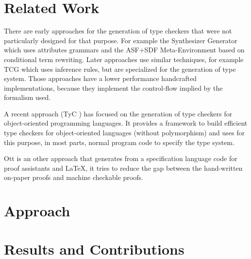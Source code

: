 \documentclass{acm_proc_article-sp}
\begin{document}
\section{Related Work}
There are early approaches for the generation of type checkers that
were not particularly designed for that purpose. For example the
Synthesizer Generator \cite{Reps:1984:SG:800020.808247} which uses
attributes grammars and the ASF+SDF Meta-Environment
\cite{vandenBrand:2001:AMC:647477.727788} based on conditional term
rewriting. Later approaches use similar techniques, for example TCG
\cite{phd/de/Gast2005} which uses inference rules, but are specialized
for the generation of type system. Those approaches have a lower
performance handcrafted implementations, because they implement the
control-flow implied by the formalism used.

A recent approach (TyC \cite{ortin2014automatic}) has focused on the
generation of type checkers for object-oriented programming
languages. It provides a framework to build efficient type checkers
for object-oriented languages (without polymorphism) and uses for this
purpose, in most parts, normal program code to specify the type
system.

Ott \cite{journals/jfp/SewellNOPRSS10} is an other approach that
generates from a specification language code for proof assistants and
\LaTeX, it tries to reduce the gap between the hand-written on-paper
proofs and machine checkable proofs.
\section{Approach}
\section{Results and Contributions}

{}

\end{document}
